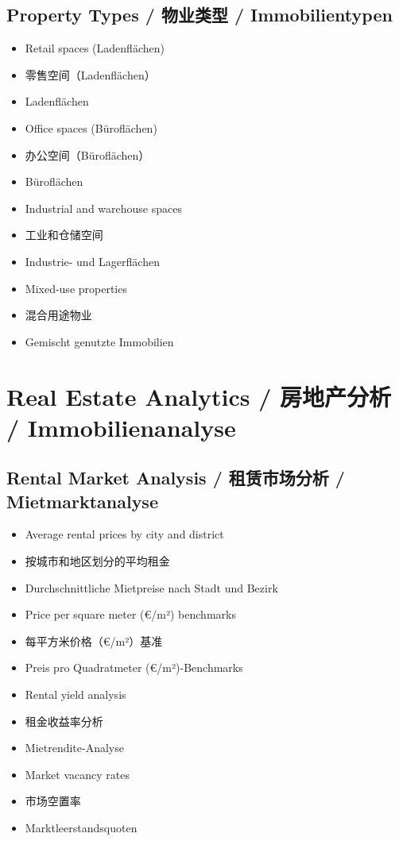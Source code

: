 \subsection{Property Types / 物业类型 / Immobilientypen}
\begin{itemize}
    \item Retail spaces (Ladenflächen)
    \item 零售空间（Ladenflächen）
    \item Ladenflächen
    \item Office spaces (Büroflächen)
    \item 办公空间（Büroflächen）
    \item Büroflächen
    \item Industrial and warehouse spaces
    \item 工业和仓储空间
    \item Industrie- und Lagerflächen
    \item Mixed-use properties
    \item 混合用途物业
    \item Gemischt genutzte Immobilien
\end{itemize}

\section{Real Estate Analytics / 房地产分析 / Immobilienanalyse}

\subsection{Rental Market Analysis / 租赁市场分析 / Mietmarktanalyse}
\begin{itemize}
    \item Average rental prices by city and district
    \item 按城市和地区划分的平均租金
    \item Durchschnittliche Mietpreise nach Stadt und Bezirk
    \item Price per square meter (€/m²) benchmarks
    \item 每平方米价格（€/m²）基准
    \item Preis pro Quadratmeter (€/m²)-Benchmarks
    \item Rental yield analysis
    \item 租金收益率分析
    \item Mietrendite-Analyse
    \item Market vacancy rates
    \item 市场空置率
    \item Marktleerstandsquoten
\end{itemize}

